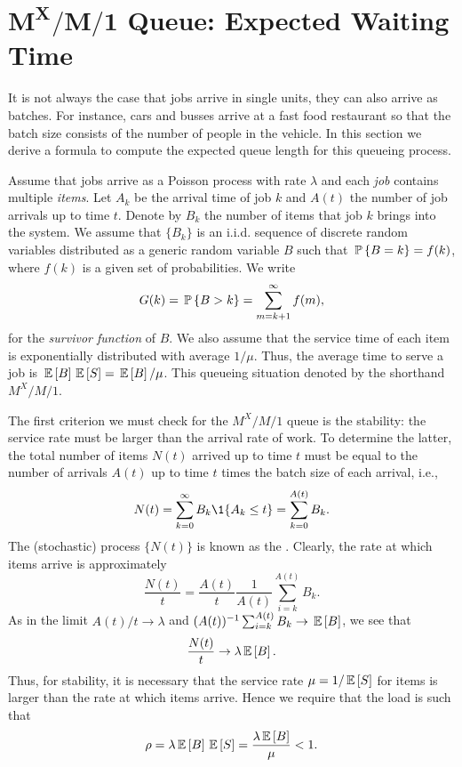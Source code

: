 \section
[$M^X/M/1$ Queue: Expected Waiting Time]
{$\mathbf{M^X/M/1}$ Queue: Expected Waiting Time}
\label{sec:mxm1-queue:-expected}

It is not always the case that jobs arrive in single units, they can
also arrive as batches. For instance, cars and busses arrive at a fast
food restaurant so that the batch size consists of the number of
people in the vehicle.  In this section we derive a formula to compute
the expected queue length for this queueing process. 


Assume that jobs arrive as a Poisson process with rate $\lambda$ and
each \emph{job} contains multiple \emph{items}.  Let $A_k$ be the
arrival time of job $k$ and $A(t)$ the number of job arrivals up to
time $t$. Denote by $B_k$ the number of items that job $k$ brings into
the system.  We assume that $\{B_k\}$ is an i.i.d. sequence of
discrete random variables distributed as a generic random variable $B$
such that $\P{B = k} = f(k)$, where $f(k)$ is a given set of
probabilities. We write
\begin{equation*}
  G(k) = \P{B>k} = \sum_{m=k+1}^\infty f(m),
\end{equation*}
for the \emph{survivor function} of $B$.  We also assume that the
service time of each item is exponentially distributed with average
$1/\mu$. Thus, the average time to serve a job is
$\E{B}\E{S}=\E B/\mu$. This queueing situation denoted by the shorthand
$M^X/M/1$.

The first criterion we must check for the $M^X/M/1$ queue is the
stability: the service rate must be larger than the arrival rate of
work. To determine the latter, the total number of items $N(t)$
arrived up to time $t$ must be equal to the number of arrivals $A(t)$
up to time $t$ times the batch size of each arrival, i.e.,
\begin{equation*}
N(t)=  \sum_{k=0}^\infty B_k \1{A_k \leq t} = \sum_{k=0}^{A(t)} B_k.
\end{equation*}
The (stochastic) process $\{N(t)\}$ is known as the . Clearly, the rate at which items arrive is
approximately
\begin{equation*}
  \frac{N(t)}t = \frac{A(t)}t \frac1{A(t)}\sum_{i=k}^{A(t)} B_k.
\end{equation*}
As in  the limit $A(t)/t \to \lambda$ and $(A(t))^{-1}\sum_{i=k}^{A(t)} B_k \to \E{B}$, we see that
\begin{align*}
\frac{N(t)}t \to \lambda \E B.
\end{align*}
Thus, for stability, it is necessary that the service rate
$\mu=1/\E S$ for items is larger than the rate at which items
arrive. Hence we require that the load is such that
\begin{equation*}
\rho = \lambda \E B \E S = \frac{\lambda \E B} \mu < 1.
\end{equation*}

